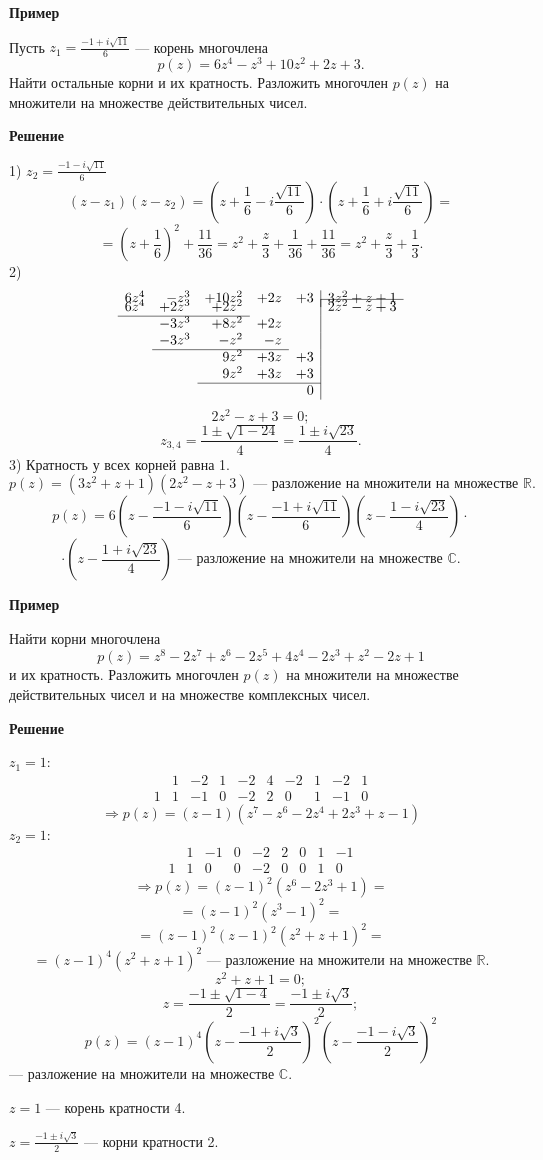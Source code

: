 \documentclass[12pt,a4paper]{article}
\begin{document}
\textbf{Пример}

Пусть $z_1=\frac{-1+i\sqrt{11}}{6}$ --- корень многочлена
$$
p(z)=6z^4-z^3+10z^2+2z+3.
$$
Найти остальные корни и их кратность. Разложить многочлен $p(z)$ на
множители на множестве действительных чисел.

\textbf{Решение}

1) $z_2=\frac{-1-i\sqrt{11}}{6}$
$$
(z-z_1)(z-z_2)=\left(z+\frac16-i\frac{\sqrt{11}}6\right)\cdot\left(z+\frac16+i\frac{\sqrt{11}}6\right)=
$$
$$
=\left(z+\frac16\right)^2+\frac{11}{36}=z^2+\frac{z}{3}+\frac{1}{36}+\frac{11}{36}=z^2+\frac{z}{3}+\frac13.
$$
2)
$$
\begin{array}{rrrrr|l}
6z^4&-z^3&+10z^2&+2z&+3&3z^2+z+1\\[-2mm]
\cline{6-6}
6z^4&+2z^3&+2z^2&&&2z^2-z+3\\
\cline{1-3}
&-3z^3&+8z^2&+2z&&\\
&-3z^3&-z^2&-z&&\\
\cline{2-4}
&&9z^2&+3z&+3&\\
&&9z^2&+3z&+3&\\
\cline{3-5}
&&&&0&
\end{array}
$$
$$
2z^2-z+3=0;
$$
$$
z_{3,4}=\frac{1\pm\sqrt{1-24}}{4}=\frac{1\pm i\sqrt{23}}{4}.
$$
3) Кратность у всех корней равна 1.
$$
p(z)=(3z^2+z+1)(2z^2-z+3) \text{ --- разложение на множители на
множестве } \mathbb R.
$$
$$
p(z)=6\left(z-\frac{-1-i\sqrt{11}}{6}\right)\left(z-\frac{-1+i\sqrt{11}}{6}\right)\left(z-\frac{1-i\sqrt{23}}{4}\right)\cdot
$$
$$
\cdot\left(z-\frac{1+i\sqrt{23}}{4}\right) \text{ --- разложение на
множители на множестве } \mathbb C.
$$

\textbf{Пример}

Найти корни многочлена
$$
p(z)=z^8-2z^7+z^6-2z^5+4z^4-2z^3+z^2-2z+1
$$
и их кратность. Разложить многочлен $p(z)$ на множители на множестве
действительных чисел и на множестве комплексных чисел.

\textbf{Решение}

$z_1=1$:
$$
\begin{array}{c|ccccccccc}
&1&-2&1&-2&4&-2&1&-2&1\\
1&1&-1&0&-2&2&0&1&-1&0
\end{array}
$$
$$
\Rightarrow p(z)=(z-1)(z^7-z^6-2z^4+2z^3+z-1)
$$
$z_2=1$:
$$
\begin{array}{c|cccccccc}
&1&-1&0&-2&2&0&1&-1\\
1&1&0&0&-2&0&0&1&0
\end{array}
$$
$$
\Rightarrow p(z)=(z-1)^2(z^6-2z^3+1)=
$$
$$
=(z-1)^2(z^3-1)^2=
$$
$$
=(z-1)^2(z-1)^2(z^2+z+1)^2=
$$
$$
=(z-1)^4(z^2+z+1)^2 \text{ --- разложение на множители на множестве } \mathbb R.
$$
$$
z^2+z+1=0;
$$
$$
z=\frac{-1\pm\sqrt{1-4}}{2}=\frac{-1\pm i\sqrt3}{2};
$$
$$
p(z)=(z-1)^4\left(z-\frac{-1+i\sqrt3}{2}\right)^2\left(z-\frac{-1-i\sqrt3}{2}\right)^2
$$
--- разложение на множители на множестве $\mathbb C$.

$z=1$ --- корень кратности 4.

$z=\frac{-1\pm i\sqrt3}{2}$ --- корни кратности 2.
\end{document}
